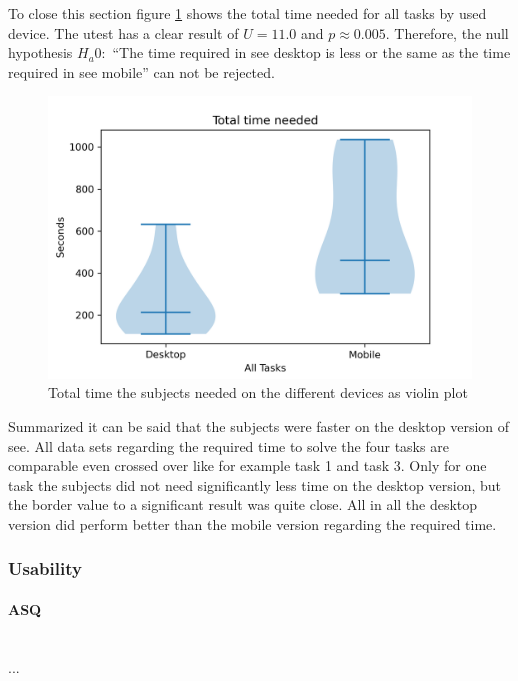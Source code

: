To close this section figure \ref{fig:device_time_violin} shows the total time needed for all tasks by used device.
The \gls{utest} has a clear result of $U=11.0$ and $p \approx 0.005$.
Therefore, the null hypothesis $H_a0:$ \enquote{The time required in \gls{see} desktop is less
or the same as the time required in see mobile} can not be rejected.

\begin{figure}[htb]
  \centering
  \includegraphics*[width=1\textwidth]{Evaluation/img/device_time_violin.png}
  \caption{Total time the subjects needed on the different devices as violin plot}
  \label{fig:device_time_violin}
\end{figure}

Summarized it can be said that the subjects were faster on the desktop version of \gls{see}.
All data sets regarding the required time to solve the four tasks are comparable even crossed over like for example task 1 and task 3. 
Only for one task the subjects did not need significantly less time on the desktop version, but the border value to a significant result was quite close.
All in all the desktop version did perform better than the mobile version regarding the required time.

\subsubsection{Usability}
\paragraph{ASQ}\mbox{}\\
...
